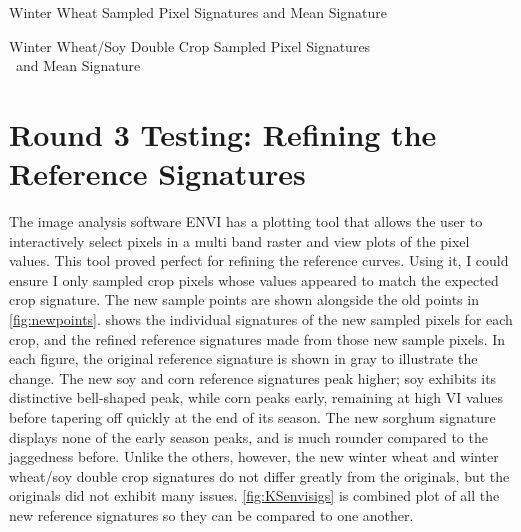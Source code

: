 \begin{ssfigure}
  \centering
  
  \caption{Winter Wheat Sampled Pixel Signatures and Mean Signature}
    \label{fig:KSwheatfirstsigs}
\end{ssfigure}

\begin{ssfigure}
  \centering
  
  \caption[Winter Wheat/Soy Double Crop Sampled Pixel Signatures and Mean Signature]{Winter Wheat/Soy Double Crop Sampled Pixel Signatures\\~and Mean Signature}
    \label{fig:KSwheatsoyfirstsigs}
\end{ssfigure}

\clearpage

\section{Round 3 Testing: Refining the Reference Signatures}
\label{appendix:testing:r3}

The image analysis software ENVI \autocite{envi5.0} has a plotting tool that allows the user to interactively select pixels in a multi band raster and view plots of the pixel values. This tool proved perfect for refining the reference curves. Using it, I could ensure I only sampled crop pixels whose values appeared to match the expected crop signature. The new sample points are shown alongside the old points in \autoref{fig:newpoints}.  shows the individual signatures of the new sampled pixels for each crop, and the refined reference signatures made from those new sample pixels. In each figure, the original reference signature is shown in gray to illustrate the change. The new soy and corn reference signatures peak higher; soy exhibits its distinctive bell-shaped peak, while corn peaks early, remaining at high VI values before tapering off quickly at the end of its season. The new sorghum signature displays none of the early season peaks, and is much rounder compared to the jaggedness before. Unlike the others, however, the new winter wheat and winter wheat/soy double crop signatures do not differ greatly from the originals, but the originals did not exhibit many issues. \autoref{fig:KSenvisigs} is combined plot of all the new reference signatures so they can be compared to one another.

